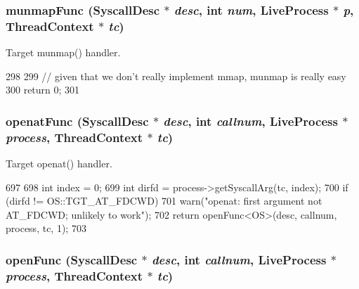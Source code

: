 \hypertarget{syscall__emul_8hh_a627dd30ab77faa503107792836ea2158}{
\subsubsection[{munmapFunc}]{ munmapFunc ({\bf SyscallDesc} $\ast$ {\em desc}, \/  int {\em num}, \/  {\bf LiveProcess} $\ast$ {\em p}, \/  {\bf ThreadContext} $\ast$ {\em tc})}}
\label{syscall__emul_8hh_a627dd30ab77faa503107792836ea2158}


Target munmap() handler. 


\begin{DoxyCode}
298 {
299     // given that we don't really implement mmap, munmap is really easy
300     return 0;
301 }
\end{DoxyCode}
\hypertarget{syscall__emul_8hh_a796691a0efbcbad98107fe763c22083b}{
\subsubsection[{openatFunc}]{ openatFunc ({\bf SyscallDesc} $\ast$ {\em desc}, \/  int {\em callnum}, \/  {\bf LiveProcess} $\ast$ {\em process}, \/  {\bf ThreadContext} $\ast$ {\em tc})}}
\label{syscall__emul_8hh_a796691a0efbcbad98107fe763c22083b}


Target openat() handler. 


\begin{DoxyCode}
697 {
698     int index = 0;
699     int dirfd = process->getSyscallArg(tc, index);
700     if (dirfd != OS::TGT_AT_FDCWD)
701         warn("openat: first argument not AT_FDCWD; unlikely to work");
702     return openFunc<OS>(desc, callnum, process, tc, 1);
703 }
\end{DoxyCode}
\hypertarget{syscall__emul_8hh_aee9c33e8ab3dbe5b14af21d403675465}{
\subsubsection[{openFunc}]{ openFunc ({\bf SyscallDesc} $\ast$ {\em desc}, \/  int {\em callnum}, \/  {\bf LiveProcess} $\ast$ {\em process}, \/  {\bf ThreadContext} $\ast$ {\em tc})}}
\label{syscall__emul_8hh_aee9c33e8ab3dbe5b14af21d403675465}


